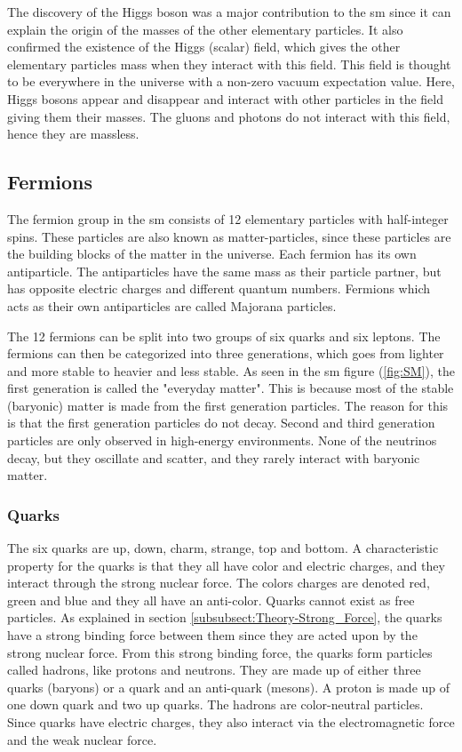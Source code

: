 \documentclass[a4paper, american, 12pt]{report}
\begin{document}
	The discovery of the Higgs boson was a major contribution to the \acrshort{sm} since it can explain the origin of the masses of the other elementary particles. It also confirmed the existence of the Higgs (scalar) field, which gives the other elementary particles mass when they interact with this field. This field is thought to be everywhere in the universe with a non-zero vacuum expectation value. Here, Higgs bosons appear and disappear and interact with other particles in the field giving them their masses. The gluons and photons do not interact with this field, hence they are massless.
	
	
	\subsection{Fermions}
	\label{subsect:Theory-Fermions}
	The fermion group in the \acrshort{sm} consists of 12 elementary particles with half-integer spins. These particles are also known as matter-particles, since these particles are the building blocks of the matter in the universe. Each fermion has its own antiparticle. The antiparticles have the same mass as their particle partner, but has opposite electric charges and different quantum numbers. Fermions which acts as their own antiparticles are called Majorana particles.
	
	The 12 fermions can be split into two groups of six quarks and six leptons. The fermions can then be categorized into three generations, which goes from lighter and more stable to heavier and less stable. As seen in the \acrshort{sm} figure (\ref{fig:SM}), the first generation is called the "everyday matter". This is because most of the stable (baryonic) matter is made from the first generation particles. The reason for this is that the first generation particles do not decay. Second and third generation particles are only observed in high-energy environments. None of the neutrinos decay, but they oscillate and scatter, and they rarely interact with baryonic matter.
	
	
	\subsubsection{Quarks}
	\label{subsubsect:Theory-Quarks}
	The six quarks are up, down, charm, strange, top and bottom. A characteristic property for the quarks is that they all have color and electric charges, and they interact through the strong nuclear force. The colors charges are denoted red, green and blue and they all have an anti-color. Quarks cannot exist as free particles. As explained in section \ref{subsubsect:Theory-Strong_Force}, the quarks have a strong binding force between them since they are acted upon by the strong nuclear force. From this strong binding force, the quarks form particles called hadrons, like protons and neutrons. They are made up of either three quarks (baryons) or a quark and an anti-quark (mesons). A proton is made up of one down quark and two up quarks. The hadrons are color-neutral particles. Since quarks have electric charges, they also interact via the electromagnetic force and the weak nuclear force.
	
\end{document}

